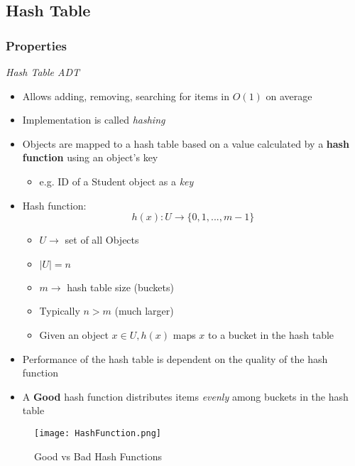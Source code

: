 \documentclass[10pt, 
a4paper, 
oneside, 
headinclude, footinclude, 
BCOR5mm]
{scrartcl}
\begin{document}
\subsection{Hash Table}
\subsubsection{Properties}
\begin{definition}
    \textit{Hash Table ADT}
    \begin{itemize}
        \item Allows adding, removing, searching for items in $O(1)$ on average
        \item Implementation is called \textit{hashing}
        \item Objects are mapped to a hash table based on a value calculated by a \textbf{hash function}
        using an object's key
        \begin{itemize}
            \item e.g. ID of a Student object as a \textit{key}
        \end{itemize}
        \item Hash function: $$h(x): U \rightarrow \{0, 1, ..., m-1\}$$
        \begin{itemize}
            \item $U\rightarrow$ set of all Objects
            \item $|U| = n$
            \item $m\rightarrow$ hash table size (buckets)
            \item Typically $n>m$ (much larger)
            \item Given an object $x\in U,h(x)$ maps $x$ to a bucket in the hash table
        \end{itemize}
        \item Performance of the hash table is dependent on the quality of the hash function
        \item A \textbf{Good} hash function distributes items \textit{evenly} among buckets in the hash table
    \end{itemize}
\end{definition}
\begin{figure}[H]
    \begin{center}
        \texttt{[image: HashFunction.png]}
        \caption{Good vs Bad Hash Functions}
        \label{fig:hashfunc}
    \end{center}
\end{figure}
\end{document}
